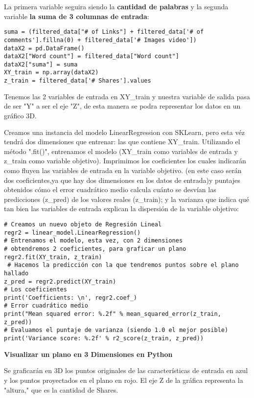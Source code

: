 \documentclass{pssbmac}
\begin{document}
La primera variable seguira siendo la \textbf{cantidad de palabras} y la segunda variable \textbf{la suma de 3 columnas de entrada}:

\begin{lstlisting}
suma = (filtered_data["# of Links"] + filtered_data['# of comments'].fillna(0) + filtered_data['# Images video'])
dataX2 = pd.DataFrame()
dataX2["Word count"] = filtered_data["Word count"]
dataX2["suma"] = suma
XY_train = np.array(dataX2)
z_train = filtered_data['# Shares'].values
\end{lstlisting}
Tenemos las 2 variables de entrada en XY\_train y nuestra variable de salida pasa de ser "Y" a ser el eje "Z", de esta manera se podra representar los datos en un gráfico 3D.

\vspace{.5cm}
Creamos una instancia del modelo LinearRegression con SKLearn, pero esta véz tendrá dos dimensiones que entrenar: las que contiene XY\_train. 
Utilizando el método ".fit()", entrenamos el modelo (XY\_train como variables de entrada y z\_train como  variable objetivo).
Imprimimos los coeficientes los cuales indicarán como fluyen las variables de entrada en la variable objetivo. (en este caso serán dos coeficientes,ya que hay dos dimensiones en los datos de entrada)y puntajes obtenidos cómo el error cuadrático medio calcula cuánto se desvían las predicciones (z\_pred) de los valores reales (z\_train); y la varianza que indica qué tan bien las variables de entrada explican la dispersión de la variable objetivo:
\begin{lstlisting}
# Creamos un nuevo objeto de Regresión Lineal
regr2 = linear_model.LinearRegression()
# Entrenamos el modelo, esta vez, con 2 dimensiones
# obtendremos 2 coeficientes, para graficar un plano
regr2.fit(XY_train, z_train)
 # Hacemos la predicción con la que tendremos puntos sobre el plano hallado
z_pred = regr2.predict(XY_train)
# Los coeficientes
print('Coefficients: \n', regr2.coef_)
# Error cuadrático medio
print("Mean squared error: %.2f" % mean_squared_error(z_train, z_pred))
# Evaluamos el puntaje de varianza (siendo 1.0 el mejor posible)
print('Variance score: %.2f' % r2_score(z_train, z_pred))
\end{lstlisting}

\vspace{.3cm}
\textbf{Visualizar un plano en 3 Dimensiones en Python}

\vspace{.4cm}
Se graficarán en 3D los puntos originales de las características de entrada en azul y los puntos proyectados en el plano en rojo. El eje Z de la gráfica representa la "altura," que es la cantidad de Shares.
\end{document}
